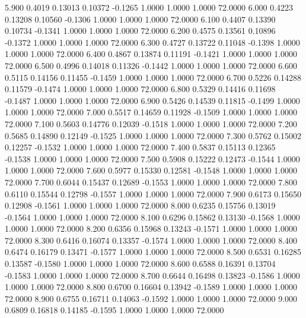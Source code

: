    5.900   0.4019   0.13013   0.10372  -0.1265   1.0000   1.0000   1.0000  72.0000
   6.000   0.4223   0.13208   0.10560  -0.1306   1.0000   1.0000   1.0000  72.0000
   6.100   0.4407   0.13390   0.10734  -0.1341   1.0000   1.0000   1.0000  72.0000
   6.200   0.4575   0.13561   0.10896  -0.1372   1.0000   1.0000   1.0000  72.0000
   6.300   0.4727   0.13722   0.11048  -0.1398   1.0000   1.0000   1.0000  72.0000
   6.400   0.4867   0.13874   0.11191  -0.1421   1.0000   1.0000   1.0000  72.0000
   6.500   0.4996   0.14018   0.11326  -0.1442   1.0000   1.0000   1.0000  72.0000
   6.600   0.5115   0.14156   0.11455  -0.1459   1.0000   1.0000   1.0000  72.0000
   6.700   0.5226   0.14288   0.11579  -0.1474   1.0000   1.0000   1.0000  72.0000
   6.800   0.5329   0.14416   0.11698  -0.1487   1.0000   1.0000   1.0000  72.0000
   6.900   0.5426   0.14539   0.11815  -0.1499   1.0000   1.0000   1.0000  72.0000
   7.000   0.5517   0.14659   0.11928  -0.1509   1.0000   1.0000   1.0000  72.0000
   7.100   0.5603   0.14776   0.12039  -0.1518   1.0000   1.0000   1.0000  72.0000
   7.200   0.5685   0.14890   0.12149  -0.1525   1.0000   1.0000   1.0000  72.0000
   7.300   0.5762   0.15002   0.12257  -0.1532   1.0000   1.0000   1.0000  72.0000
   7.400   0.5837   0.15113   0.12365  -0.1538   1.0000   1.0000   1.0000  72.0000
   7.500   0.5908   0.15222   0.12473  -0.1544   1.0000   1.0000   1.0000  72.0000
   7.600   0.5977   0.15330   0.12581  -0.1548   1.0000   1.0000   1.0000  72.0000
   7.700   0.6044   0.15437   0.12689  -0.1553   1.0000   1.0000   1.0000  72.0000
   7.800   0.6110   0.15544   0.12798  -0.1557   1.0000   1.0000   1.0000  72.0000
   7.900   0.6173   0.15650   0.12908  -0.1561   1.0000   1.0000   1.0000  72.0000
   8.000   0.6235   0.15756   0.13019  -0.1564   1.0000   1.0000   1.0000  72.0000
   8.100   0.6296   0.15862   0.13130  -0.1568   1.0000   1.0000   1.0000  72.0000
   8.200   0.6356   0.15968   0.13243  -0.1571   1.0000   1.0000   1.0000  72.0000
   8.300   0.6416   0.16074   0.13357  -0.1574   1.0000   1.0000   1.0000  72.0000
   8.400   0.6474   0.16179   0.13471  -0.1577   1.0000   1.0000   1.0000  72.0000
   8.500   0.6531   0.16285   0.13587  -0.1580   1.0000   1.0000   1.0000  72.0000
   8.600   0.6588   0.16391   0.13704  -0.1583   1.0000   1.0000   1.0000  72.0000
   8.700   0.6644   0.16498   0.13823  -0.1586   1.0000   1.0000   1.0000  72.0000
   8.800   0.6700   0.16604   0.13942  -0.1589   1.0000   1.0000   1.0000  72.0000
   8.900   0.6755   0.16711   0.14063  -0.1592   1.0000   1.0000   1.0000  72.0000
   9.000   0.6809   0.16818   0.14185  -0.1595   1.0000   1.0000   1.0000  72.0000
